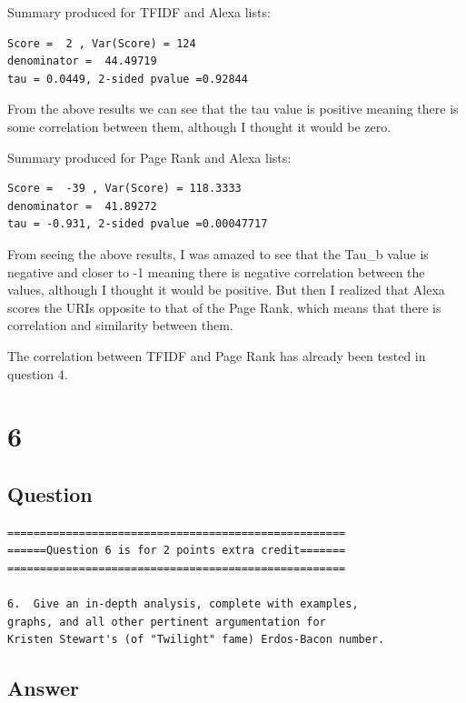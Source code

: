 \documentclass[letterpaper,11pt]{article}
\begin{document}
Summary produced for TFIDF and Alexa lists:

\begin{verbatim}
Score =  2 , Var(Score) = 124
denominator =  44.49719
tau = 0.0449, 2-sided pvalue =0.92844
\end{verbatim}

From the above results we can see that the tau value is positive meaning there is some correlation between them, although I thought it would be zero.

Summary produced for Page Rank and Alexa lists:

\begin{verbatim}
Score =  -39 , Var(Score) = 118.3333
denominator =  41.89272
tau = -0.931, 2-sided pvalue =0.00047717

\end{verbatim}

From seeing the above results, I was amazed to see that the Tau\_b value is negative and closer to -1 meaning there is negative correlation between the values, although I thought it would be positive. But then I realized that Alexa scores the URIs opposite to that of the Page Rank, which means that there is correlation and similarity between them.

The correlation between TFIDF and Page Rank has already been tested in question 4.


\clearpage

\section*{6}

\subsection*{Question}

\begin{verbatim}
====================================================
======Question 6 is for 2 points extra credit=======
====================================================

6.  Give an in-depth analysis, complete with examples, 
graphs, and all other pertinent argumentation for 
Kristen Stewart's (of "Twilight" fame) Erdos-Bacon number.

\end{verbatim}

\clearpage
\subsection*{Answer}
\end{document}
